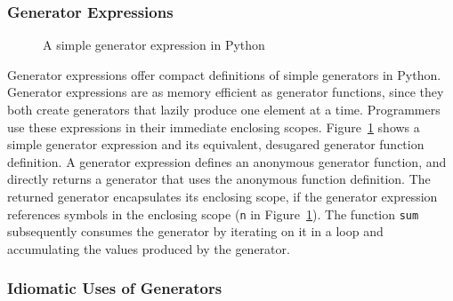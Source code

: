 \subsubsection*{Generator Expressions}

\begin{figure}[h]
\centering
{}
\caption{A simple generator expression in Python}
\label{fig:ch4-genexp-example}
\end{figure}

Generator expressions offer compact definitions of simple generators in Python.
Generator expressions are as memory efficient as generator functions, since they both create generators that lazily produce one element at a time.
Programmers use these expressions in their immediate enclosing scopes.
Figure~\ref{fig:ch4-genexp-example} shows a simple generator expression and its equivalent, desugared generator function definition.
A generator expression defines an anonymous generator function, and directly returns a generator that uses the anonymous function definition.
The returned generator encapsulates its enclosing scope, if the generator expression references symbols in the enclosing scope (\texttt{n} in Figure~\ref{fig:ch4-genexp-example}).
The function \texttt{sum} subsequently consumes the generator by iterating on it in a loop and accumulating the values produced by the generator.

\subsubsection*{Idiomatic Uses of Generators}

